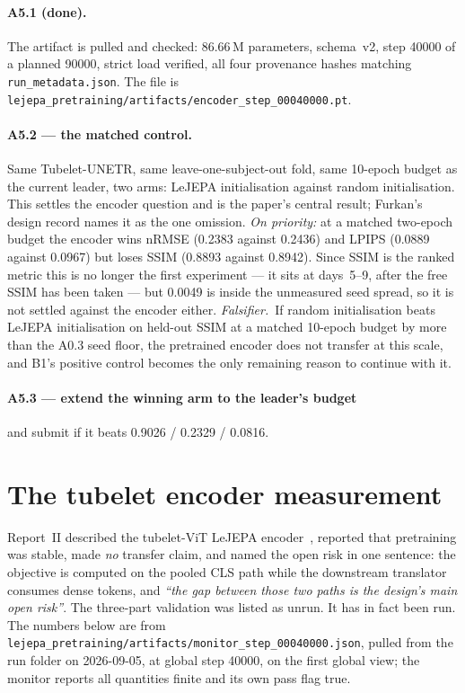 \documentclass[11pt,a4paper]{article}
\newcommand{\rmse}{nRMSE}
\newcommand{\reporttwo}{Report~II}
\newcommand{\fals}{\textit{Falsifier.}\ }
\begin{document}
\paragraph{A5.1 (done).} The artifact is pulled and checked: \num{86.66}\,M parameters, schema~v2, step
\num{40000} of a planned \num{90000}, strict load verified, all four provenance hashes matching
\texttt{run\_metadata.json}. The file is
\texttt{lejepa\_pretraining/artifacts/encoder\_step\_00040000.pt}.

\paragraph{A5.2 --- the matched control.} Same Tubelet-UNETR, same leave-one-subject-out fold, same
10-epoch budget as the current leader, two arms: LeJEPA initialisation against random initialisation.
This settles the encoder question and is the paper's central result; Furkan's design record names it as
the one omission. \emph{On priority:} at a matched two-epoch budget the encoder wins \rmse{}
(\num{0.2383} against \num{0.2436}) and LPIPS (\num{0.0889} against \num{0.0967}) but loses SSIM
(\num{0.8893} against \num{0.8942}). Since SSIM is the ranked metric this is no longer the first
experiment --- it sits at days~5--9, after the free SSIM has been taken --- but \num{0.0049} is inside
the unmeasured seed spread, so it is not settled against the encoder either.
\fals If random initialisation beats LeJEPA initialisation on held-out SSIM at a matched 10-epoch budget
by more than the A0.3 seed floor, the pretrained encoder does not transfer at this scale, and B1's
positive control becomes the only remaining reason to continue with it.

\paragraph{A5.3 --- extend the winning arm to the leader's budget} and submit if it beats
\num{0.9026} / \num{0.2329} / \num{0.0816}.

\section{The tubelet encoder measurement}
\label{sec:tubelet}

\reporttwo{} described the tubelet-ViT LeJEPA encoder~\cite{lejepa}, reported that pretraining was stable,
made \emph{no} transfer claim, and named the open risk in one sentence: the objective is computed on the
pooled CLS path while the downstream translator consumes dense tokens, and \emph{``the gap between those
two paths is the design's main open risk''}. The three-part validation was listed as unrun. It has in
fact been run. The numbers below are from
\texttt{lejepa\_pretraining/\allowbreak artifacts/\allowbreak monitor\_step\_00040000.json}, pulled from the run folder on
2026-09-05, at global step \num{40000}, on the first global view; the monitor reports all quantities
finite and its own pass flag true.
\end{document}
